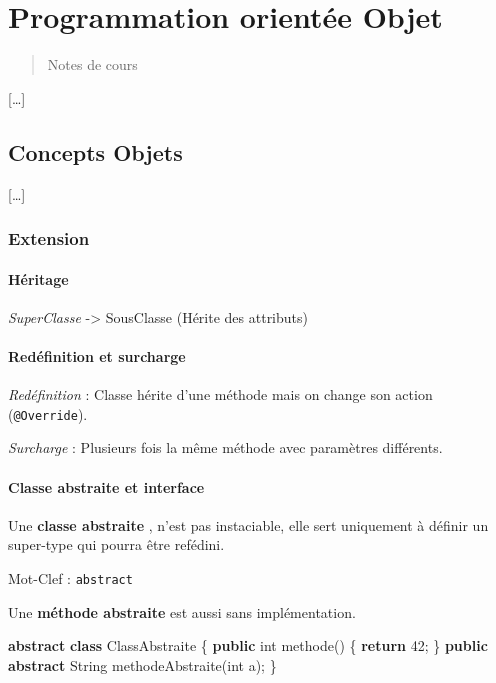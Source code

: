 \documentclass[]{article}
\date{}
\newenvironment{Shaded}{}{}
\newcommand{\KeywordTok}[1]{\textcolor[rgb]{0.00,0.44,0.13}{\textbf{{#1}}}}
\newcommand{\DataTypeTok}[1]{\textcolor[rgb]{0.56,0.13,0.00}{{#1}}}
\newcommand{\DecValTok}[1]{\textcolor[rgb]{0.25,0.63,0.44}{{#1}}}
\newcommand{\FunctionTok}[1]{\textcolor[rgb]{0.02,0.16,0.49}{{#1}}}
\newcommand{\NormalTok}[1]{{#1}}
\begin{document}
\section{Programmation orientée
Objet}\label{programmation-orientuxe9e-objet}

\begin{quote}
Notes de cours
\end{quote}

{[}\ldots{}{]}

\subsection{Concepts Objets}\label{concepts-objets}

{[}\ldots{}{]}

\subsubsection{Extension}\label{extension}

\paragraph{Héritage}\label{huxe9ritage}

\emph{SuperClasse} -\textgreater{} SousClasse (Hérite des attributs)

\paragraph{Redéfinition et
surcharge}\label{reduxe9finition-et-surcharge}

\emph{Redéfinition} : Classe hérite d'une méthode mais on change son
action (\texttt{@Override}).

\emph{Surcharge} : Plusieurs fois la même méthode avec paramètres
différents.

\paragraph{Classe abstraite et
interface}\label{classe-abstraite-et-interface}

Une \textbf{classe abstraite} , n'est pas instaciable, elle sert
uniquement à définir un super-type qui pourra être refédini.

Mot-Clef : \texttt{abstract}

Une \textbf{méthode abstraite} est aussi sans implémentation.

\begin{Shaded}
\begin{Highlighting}[]
\KeywordTok{abstract} \KeywordTok{class} \NormalTok{ClassAbstraite \{}
    \KeywordTok{public} \DataTypeTok{int} \FunctionTok{methode}\NormalTok{() \{}
        \KeywordTok{return} \DecValTok{42}\NormalTok{;}
    \NormalTok{\}}
    \KeywordTok{public} \KeywordTok{abstract} \NormalTok{String }\FunctionTok{methodeAbstraite}\NormalTok{(}\DataTypeTok{int} \NormalTok{a);}
\NormalTok{\}}
\end{Highlighting}
\end{Shaded}
\end{document}

